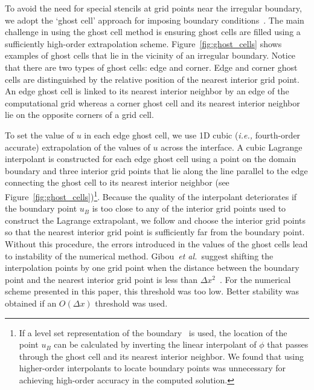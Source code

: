 \documentclass[fleqn,12pt,twoside]{article}
\def\dx{\Delta x}
\def\ie{\emph{i.e., }}
\def\etal{\emph{et al.}}
\begin{document}
To avoid the need for special stencils at grid points near the irregular 
boundary, we adopt the `ghost cell' approach for imposing boundary 
conditions~\cite{gibou_2005,ito_2005,fedkiw_1999,osher_fedkiw_book}.
The main challenge in using the ghost cell method is ensuring ghost cells 
are filled using a sufficiently high-order extrapolation scheme. 
Figure~\ref{fig:ghost_cells} shows examples of ghost cells that lie in the 
vicinity of an irregular boundary.  Notice that there are two types of ghost 
cells:  edge and corner.  Edge and corner ghost cells are distinguished by 
the relative position of the nearest interior grid point.  An edge ghost cell 
is linked to its nearest interior neighbor by an edge of the computational 
grid whereas a corner ghost cell and its nearest interior neighbor lie on the 
opposite corners of a grid cell.

To set the value of $u$ in each edge ghost cell, we use 1D cubic 
(\ie fourth-order accurate) extrapolation of the values of $u$ across the 
interface.  A cubic Lagrange interpolant is constructed for each edge ghost 
cell using a point on the domain boundary and three interior grid points that 
lie along the line parallel to the edge connecting the ghost cell to its 
nearest interior neighbor (see Figure~\ref{fig:ghost_cells})\footnote{If
a level set representation of the boundary~\cite{osher_fedkiw_book} is used, 
the location of the point $u_B$ can be calculated by inverting the linear 
interpolant of $\phi$ that passes through the ghost cell and its nearest
interior neighbor.  We found that using higher-order interpolants to 
locate boundary points was unnecessary for achieving high-order accuracy in 
the computed solution.}.  Because the quality of the interpolant deteriorates 
if the boundary point $u_B$ is too close to any of the interior grid points 
used to construct the Lagrange extrapolant, we follow \cite{gibou_2005} and 
choose the interior grid points so that the nearest interior grid point is 
sufficiently far from the boundary point.  Without this procedure, the errors 
introduced in the values of the ghost cells lead to instability of the 
numerical method.
Gibou~\etal~suggest shifting the interpolation points by one grid point 
when the distance between the boundary point and the nearest interior grid 
point is less than $\dx^2$~\cite{gibou_2005}.  For the numerical scheme 
presented in this paper, this threshold was too low.  Better stability was 
obtained if an $O(\dx)$ threshold was used.
\end{document}

